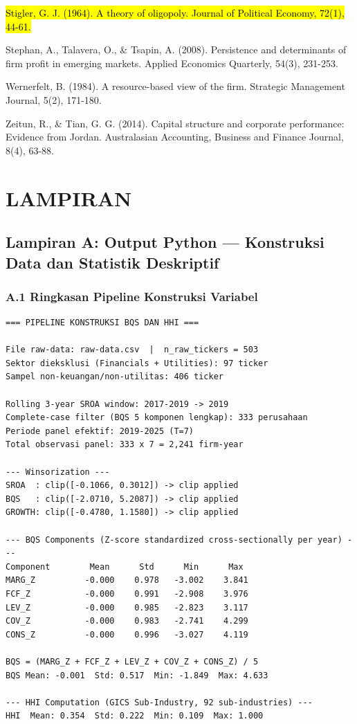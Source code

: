 \documentclass[12pt,a4paper]{article}
\renewcommand{\thesection}{\Roman{section}}
\begin{document}
\hl{Stigler, G. J. (1964). A theory of oligopoly. Journal of Political Economy, 72(1), 44-61.}

Stephan, A., Talavera, O., \& Tsapin, A. (2008). Persistence and
determinants of firm profit in emerging markets. Applied Economics
Quarterly, 54(3), 231-253.

Wernerfelt, B. (1984). A resource-based view of the firm. Strategic
Management Journal, 5(2), 171-180.

Zeitun, R., \& Tian, G. G. (2014). Capital structure and corporate
performance: Evidence from Jordan. Australasian Accounting, Business and
Finance Journal, 8(4), 63-88.

\appendix
\renewcommand{\thesection}{\Alph{section}}

\section*{LAMPIRAN}\label{lampiran}

\subsection{Lampiran A: Output Python --- Konstruksi Data dan Statistik
Deskriptif}\label{lampiran-a-output-python-konstruksi-data-dan-statistik-deskriptif}

\subsubsection{A.1 Ringkasan Pipeline Konstruksi
Variabel}\label{a.1-ringkasan-pipeline-konstruksi-variabel}

\begin{small}
\begin{verbatim}
=== PIPELINE KONSTRUKSI BQS DAN HHI ===

File raw-data: raw-data.csv  |  n_raw_tickers = 503
Sektor dieksklusi (Financials + Utilities): 97 ticker
Sampel non-keuangan/non-utilitas: 406 ticker

Rolling 3-year SROA window: 2017-2019 -> 2019
Complete-case filter (BQS 5 komponen lengkap): 333 perusahaan
Periode panel efektif: 2019-2025 (T=7)
Total observasi panel: 333 x 7 = 2,241 firm-year

--- Winsorization ---
SROA  : clip([-0.1066, 0.3012]) -> clip applied
BQS   : clip([-2.0710, 5.2087]) -> clip applied
GROWTH: clip([-0.4780, 1.1580]) -> clip applied

--- BQS Components (Z-score standardized cross-sectionally per year) ---
Component        Mean      Std      Min      Max
MARG_Z          -0.000    0.978   -3.002    3.841
FCF_Z           -0.000    0.991   -2.908    3.976
LEV_Z           -0.000    0.985   -2.823    3.117
COV_Z           -0.000    0.983   -2.741    4.299
CONS_Z          -0.000    0.996   -3.027    4.119

BQS = (MARG_Z + FCF_Z + LEV_Z + COV_Z + CONS_Z) / 5
BQS Mean: -0.001  Std: 0.517  Min: -1.849  Max: 4.633

--- HHI Computation (GICS Sub-Industry, 92 sub-industries) ---
HHI  Mean: 0.354  Std: 0.222  Min: 0.109  Max: 1.000
\end{verbatim}
\end{small}
\end{document}

